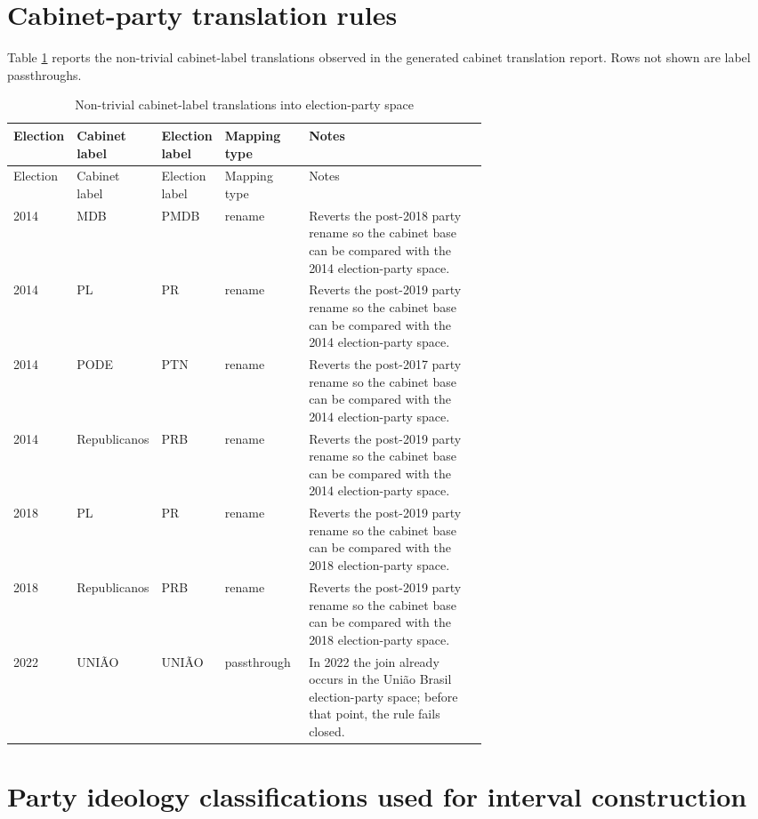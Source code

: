 \documentclass[11pt]{article}
\begin{document}
\section{Cabinet-party translation rules}\label{app:cabinet-crosswalk}

Table \ref{tab:cabinet-crosswalk} reports the non-trivial cabinet-label
translations observed in the generated cabinet translation report. Rows not
shown are label passthroughs.

\begin{longtable}{lll p{0.18\linewidth} p{0.44\linewidth}}
\caption{Non-trivial cabinet-label translations into election-party space}\label{tab:cabinet-crosswalk}\\
\toprule
Election & Cabinet label & Election label & Mapping type & Notes \\
\midrule
\endfirsthead
\toprule
Election & Cabinet label & Election label & Mapping type & Notes \\
\midrule
\endhead
2014 & MDB & PMDB & rename & Reverts the post-2018 party rename so the cabinet base can be compared with the 2014 election-party space. \\
2014 & PL & PR & rename & Reverts the post-2019 party rename so the cabinet base can be compared with the 2014 election-party space. \\
2014 & PODE & PTN & rename & Reverts the post-2017 party rename so the cabinet base can be compared with the 2014 election-party space. \\
2014 & Republicanos & PRB & rename & Reverts the post-2019 party rename so the cabinet base can be compared with the 2014 election-party space. \\
2018 & PL & PR & rename & Reverts the post-2019 party rename so the cabinet base can be compared with the 2018 election-party space. \\
2018 & Republicanos & PRB & rename & Reverts the post-2019 party rename so the cabinet base can be compared with the 2018 election-party space. \\
2022 & UNIÃO & UNIÃO & passthrough & In 2022 the join already occurs in the União Brasil election-party space; before that point, the rule fails closed. \\
\bottomrule
\end{longtable}


\section{Party ideology classifications used for interval construction}\label{app:ideology-order}
\end{document}
